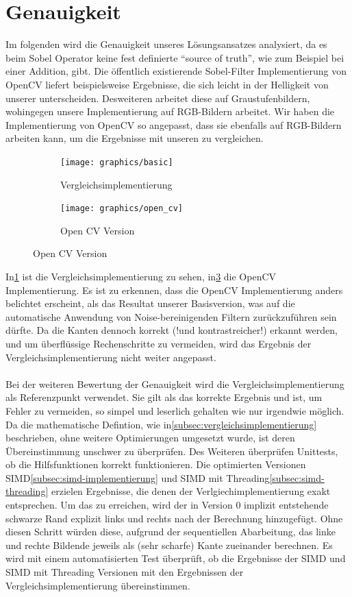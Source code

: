 \documentclass[course=erap]{aspdoc}
\begin{document}
\section{Genauigkeit}\label{sec:genauigkeit}
Im folgenden wird die Genauigkeit unseres Lösungsansatzes analysiert, da es beim Sobel Operator keine fest definierte \enquote{source of truth}, wie zum Beispiel bei einer Addition, gibt.
Die öffentlich existierende Sobel-Filter Implementierung von OpenCV liefert beispielsweise Ergebnisse, die sich leicht in der Helligkeit von unserer unterscheiden.
Desweiteren arbeitet diese auf Graustufenbildern, wohingegen unsere Implementierung auf RGB-Bildern arbeitet.
Wir haben die Implementierung von OpenCV so angepasst, dass sie ebenfalls auf RGB-Bildern arbeiten kann, um die Ergebnisse mit unseren zu vergleichen.
\begin{figure}[H]
    \begin{subfigure}{.5\columnwidth}
        \centering
        \texttt{[image: graphics/basic]}
        \caption{Vergleichsimplementierung}
        \label{fig:basic}
    \end{subfigure}
    \begin{subfigure}{.5\columnwidth}
        \centering
        \texttt{[image: graphics/open\_cv]}
        \caption{Open CV Version}
        \label{fig:opencv}
    \end{subfigure}
\end{figure}
In\ref{fig:basic} ist die Vergleichsimplementierung zu sehen, in\ref{fig:opencv} die OpenCV Implementierung.
Es ist zu erkennen, dass die OpenCV Implementierung anders belichtet erscheint, als das Resultat unserer Basisversion, was auf die automatische Anwendung von Noise-bereinigenden Filtern zurückzuführen sein dürfte.
Da die Kanten dennoch korrekt (!und kontrastreicher!) erkannt werden, und um überflüssige Rechenschritte zu vermeiden, wird das Ergebnis der Vergleichsimplementierung nicht weiter angepasst.
\\\\
Bei der weiteren Bewertung der Genauigkeit wird die Vergleichsimplementierung als Referenzpunkt verwendet.
Sie gilt als das korrekte Ergebnis und ist, um Fehler zu vermeiden, so simpel und leserlich gehalten wie nur irgendwie möglich.
Da die mathematische Defintion, wie in\ref{subsec:vergleichsimplementierung} beschrieben, ohne weitere Optimierungen umgesetzt wurde, ist deren Übereinstimmung unschwer zu überprüfen.
Des Weiteren überprüfen Unittests, ob die Hilfsfunktionen korrekt funktionieren.
Die optimierten Versionen SIMD\ref{subsec:simd-implementierung} und SIMD mit Threading\ref{subsec:simd-threading} erzielen Ergebnisse, die denen der Verlgiechimplementierung exakt entsprechen.
Um das zu erreichen, wird der in Version 0 implizit entstehende schwarze Rand explizit links und rechts nach der Berechnung hinzugefügt.
Ohne diesen Schritt würden diese, aufgrund der sequentiellen Abarbeitung, das linke und rechte Bildende jeweils als (sehr scharfe) Kante zueinander berechnen.
Es wird mit einem automatisierten Test überprüft, ob die Ergebnisse der SIMD und SIMD mit Threading Versionen mit den Ergebnissen der Vergleichsimplementierung übereinstimmen.
\end{document}
